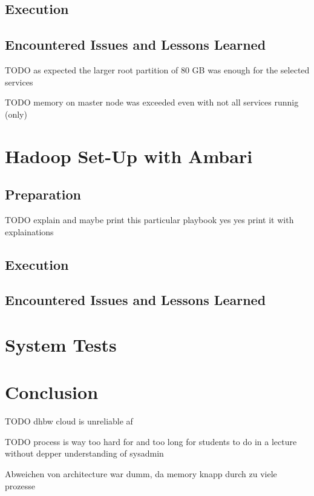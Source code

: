 \subsection{Execution}

\subsection{Encountered Issues and Lessons Learned}

TODO as expected the larger root partition of 80 GB was enough for the selected services

TODO memory on master node was exceeded even with not all services runnig (only)


\section{Hadoop Set-Up with Ambari}

\subsection{Preparation}

TODO explain and maybe print this particular playbook yes yes print it with explainations

\subsection{Execution}

\subsection{Encountered Issues and Lessons Learned}

\section{System Tests}

\section{Conclusion}

TODO dhbw cloud is unreliable af

TODO process is way too hard for and too long for students to do in a lecture without depper understanding of sysadmin  

Abweichen von architecture war dumm, da memory knapp durch zu viele prozesse



